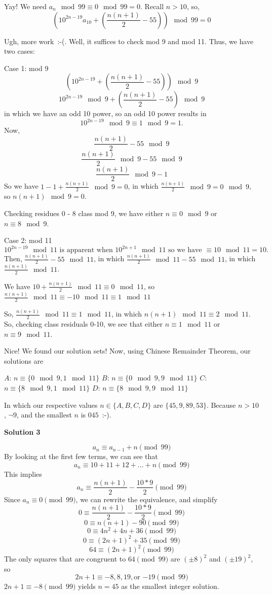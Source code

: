 \begin{enumerate}
 Yay! We need $a_n \mod 99 \equiv 0 \mod 99 = 0$. Recall $n>10$, so,
 \[\left(10^{2n-19}a_{10}+\left(\frac{n(n+1)}{2}-55\right)\right) \mod 99 = 0\]

 Ugh, more work :-(. Well, it suffices to check mod 9 and mod 11. Thus, we have two cases:

 Case 1: mod 9
 \[\left(10^{2n-19}+\left(\frac{n(n+1)}{2}-55\right)\right) \mod 9\]
 \[10^{2n-19} \mod 9 + \left(\frac{n(n+1)}{2} -55\right) \mod 9\]in which we have an odd 10 power, so an odd 10 power results in
 \[10^{2n-19} \mod 9 \equiv 1 \mod 9 = 1.\]Now,
 \[\frac{n(n+1)}{2} - 55 \mod 9\]
 \[\frac{n(n+1)}{2} \mod 9 - 55 \mod 9\]
 \[\frac{n(n+1)}{2} \mod 9 - 1\]So we have $1-1 + \frac{n(n+1)}{2} \mod 9 = 0$, in which $\frac{n(n+1)}{2} \mod 9 =0 \mod 9$, so $n(n+1) \mod 9 = 0$.

 Checking residues 0 - 8 class mod 9, we have either $n \equiv 0 \mod 9$ or $n \equiv 8 \mod 9$.

 Case 2: mod 11
 \[10^{2n-19} \mod 11 \text{ is apparent when } 10^{2n+1} \mod 11 \text{ so we have } \equiv 10 \mod 11 = 10.\]Then, $\frac{n(n+1)}{2} -55 \mod 11$, in which $\frac{n(n+1)}{2} \mod 11 - 55 \mod 11$, in which $\frac{n(n+1)}{2} \mod 11$.

 We have $10+\frac{n(n+1)}{2} \mod 11 \equiv 0 \mod 11$, so $\frac{n(n+1)}{2} \mod 11 \equiv -10 \mod 11 \equiv 1 \mod 11$

 So, $\frac{n(n+1)}{2} \mod 11 \equiv 1 \mod 11$, in which $n(n+1) \mod 11 \equiv 2 \mod 11$. So, checking class residuals 0-10, we see that either $n \equiv 1 \mod 11$ or $n \equiv 9 \mod 11$.

 Nice! We found our solution sets! Now, using Chinese Remainder Theorem, our solutions are

 $A$: $n \equiv \{0 \mod 9, 1 \mod 11\}$
$B$: $n \equiv \{0 \mod 9, 9 \mod 11\}$
$C$: $n \equiv \{8 \mod 9, 1 \mod 11\}$
$D$: $n \equiv \{8 \mod 9, 9 \mod 11\}$

 In which our respective values $n\in\{A,B,C,D\}$ are $\{45, 9, 89, 53\}$. Because $n > 10$, $\neg 9$, and the smallest $n$ is $\boxed{045}$ :-).

 



\textbf{Solution 3}


 \[a_n \equiv a_{n-1} + n \pmod {99}\]By looking at the first few terms, we can see that 
 \[a_n \equiv 10+11+12+ \dots + n \pmod {99}\]This implies
 \[a_n \equiv \frac{n(n+1)}{2} - \frac{10*9}{2} \pmod {99}\]Since $a_n \equiv 0 \pmod {99}$, we can rewrite the equivalence, and simplify 
 \[0 \equiv \frac{n(n+1)}{2} - \frac{10*9}{2} \pmod {99}\]
 \[0 \equiv n(n+1) - 90 \pmod {99}\]
 \[0 \equiv 4n^2+4n+36 \pmod {99}\]
 \[0 \equiv (2n+1)^2+35 \pmod {99}\]
 \[64 \equiv (2n+1)^2 \pmod {99}\]The only squares that are congruent to $64 \pmod {99}$ are $(\pm 8)^2$ and $(\pm 19)^2$, so 
 \[2n+1 \equiv -8, 8, 19, \text{or } {-19} \pmod {99}\]$2n+1 \equiv -8 \pmod {99}$ yields $n=45$ as the smallest integer solution.


\end{enumerate}
